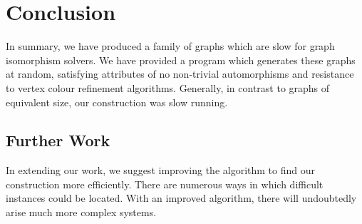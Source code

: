 \chapter{Conclusion}

\ifpdf
    \graphicspath{{Chapter3/Figs/Raster/}{Chapter3/Figs/PDF/}{Chapter3/Figs/}}
\else
    \graphicspath{{Chapter3/Figs/Vector/}{Chapter3/Figs/}}
\fi

In summary, we have produced a family of graphs which are slow for graph isomorphism solvers. We have provided a program which generates these graphs at random, satisfying attributes of no non-trivial automorphisms and resistance to vertex colour refinement algorithms. Generally, in contrast to graphs of equivalent size, our construction was slow running. 

\section[Further Work]{Further Work}
In extending our work, we suggest improving the algorithm to find our construction more efficiently. There are numerous ways in which difficult instances could be located. With an improved algorithm, there will undoubtedly arise much more complex systems. 
